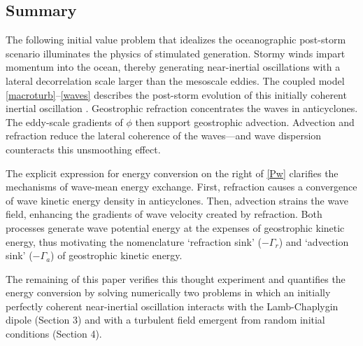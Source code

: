 \documentclass{jfm}
\begin{document}
\subsection{Summary}
The following initial value problem that idealizes the oceanographic post-storm scenario
illuminates the physics of stimulated generation. Stormy winds impart momentum
into the ocean, thereby generating near-inertial oscillations with a lateral
decorrelation scale larger than the mesoscale eddies. The coupled model
\eqref{macroturb}--\eqref{waves} describes the post-storm evolution
of this initially coherent inertial oscillation
 \citep{xie_vanneste2015,wagner_young2016}. Geostrophic refraction
concentrates the waves in anticyclones. The eddy-scale gradients of $\phi$ then support
geostrophic advection. Advection and refraction reduce the lateral coherence
of the waves---and wave dispersion counteracts this unsmoothing effect.

The explicit expression for energy
conversion on the right of \eqref{Pw} clarifies the mechanisms of wave-mean energy
exchange. First, refraction causes a convergence of wave kinetic energy density in
anticyclones. Then, advection strains the wave field, enhancing the gradients of
wave velocity created by refraction. Both
processes generate wave potential energy at the expenses of geostrophic kinetic
energy, thus motivating the nomenclature `refraction sink' ($-\Gamma_r$) and
`advection sink' ($-\Gamma_a$)  of geostrophic kinetic energy.

The remaining of this paper verifies this thought experiment and quantifies the
energy conversion by solving
numerically two problems in which an initially perfectly coherent near-inertial
oscillation interacts with the Lamb-Chaplygin dipole (Section 3) and with a turbulent
field emergent from random initial conditions (Section 4).
\end{document}
